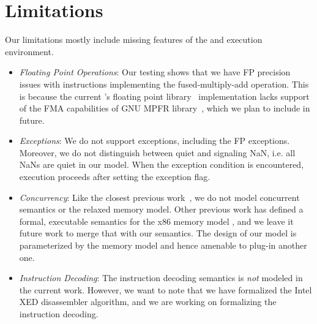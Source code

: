 \section{Limitations}\label{sec:limit}
Our limitations mostly include missing features of the \ISA and execution environment.
%
\begin{itemize}
 \item {\em Floating Point Operations\/}: Our testing shows that we have FP precision issues with instructions implementing the fused-multiply-add operation. This is because the current \K's floating point library~\cite{MPFRJAVA} implementation lacks support of the FMA capabilities of GNU MPFR library~\cite{GNUMPFR}, which we plan to include in future.
 \item {\em Exceptions\/}: We do not support exceptions, including the FP exceptions. Moreover, we do not distinguish between quiet and signaling NaN, i.e. all NaNs are quiet in our model. When the exception condition is encountered, execution proceeds after setting the exception flag.
 \item {\em Concurrency\/}: Like the closest previous work~\cite{Goel:FMCAD14,Heule2016a}, we do not model concurrent semantics or the relaxed memory model. Other previous work has defined a formal, executable semantics for the x86 memory model \cite{Sarkar:POPL09,Owens:x86-TSO}, and we leave it future work to merge that with our semantics. The design of our model  is parameterized by the memory model and hence amenable to plug-in another one.
 \item {\em Instruction Decoding\/}: The instruction decoding semantics is \emph{not} modeled in the current work. However, we want to note that we have formalized the Intel XED disassembler algorithm, and we are working on formalizing the instruction decoding.
\end{itemize}

